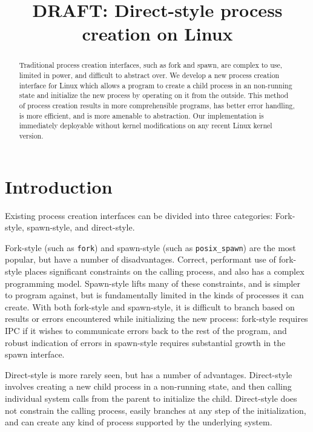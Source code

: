 \documentclass[letterpaper,twocolumn,10pt]{article}
\begin{document}
\newcommand{\twosigma}{[tech company]} 
\date{}
\title{\Large \bf DRAFT: Direct-style process creation on Linux}
\maketitle
\begin{abstract}
Traditional process creation interfaces,
such as fork and spawn,
are complex to use, limited in power, and difficult to abstract over.
We develop a new process creation interface for Linux
which allows a program to create a child process in an non-running state
and initialize the new process by operating on it from the outside.
This method of process creation results in more comprehensible programs, 
has better error handling,
is more efficient,
and is more amenable to abstraction.
Our implementation is immediately deployable without kernel modifications on any recent Linux kernel version.
\end{abstract}

\section{Introduction}\label{introduction}
Existing process creation interfaces can be divided into three categories:
Fork-style, spawn-style, and direct-style.

Fork-style (such as \texttt{fork}) and spawn-style (such as \texttt{posix\_spawn}) are the most popular,
but have a number of disadvantages.
Correct, performant use of fork-style places significant constraints on the calling process,
and also has a complex programming model.
Spawn-style lifts many of these constraints, and is simpler to program against,
but is fundamentally limited in the kinds of processes it can create.
With both fork-style and spawn-style,
it is difficult to
branch based on results or errors encountered while initializing the new process:
fork-style requires IPC if it wishes to communicate errors back to the rest of the program,
and robust indication of errors in spawn-style requires substantial growth in the spawn interface.

Direct-style is more rarely seen, but has a number of advantages.
Direct-style involves creating a new child process in a non-running state,
and then calling individual system calls from the parent to initialize the child.
Direct-style does not constrain the calling process,
easily branches at any step of the initialization,
and can create any kind of process supported by the underlying system.
\end{document}
